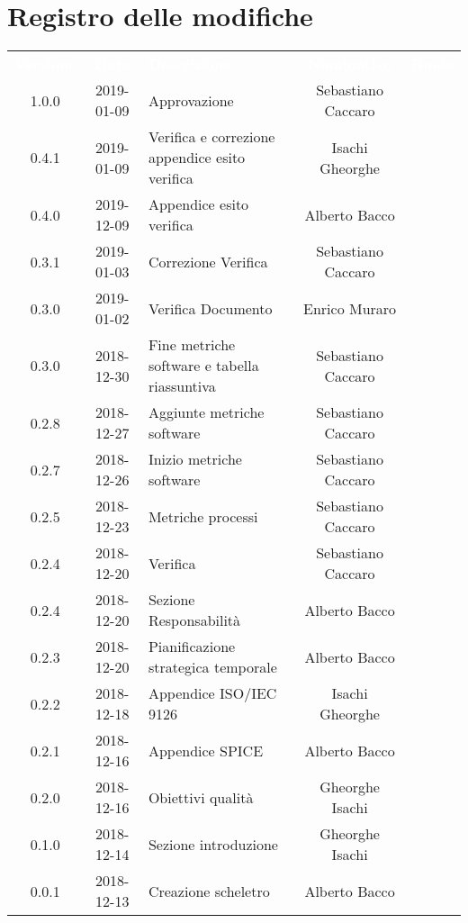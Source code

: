 \section*{Registro delle modifiche}
{
	\renewcommand{\arraystretch}{1.5}
	\centering
	\begin{longtable}{c c C{4cm} c  c }
		\textcolor{white}{\textbf{Versione}} &
		\textcolor{white}{\textbf{Data}} &
		\textcolor{white}{\textbf{Descrizione}} &
		\textcolor{white}{\textbf{Nominativo}} &
		\textcolor{white}{\textbf{Ruolo}}
		\\
		1.0.0 &
		2019-01-09 &
		Approvazione &
		Sebastiano Caccaro &
		\Res{}
		\\
		0.4.1 &
		2019-01-09 &
		Verifica e correzione appendice esito verifica &
		Isachi Gheorghe &
		\ver{}
		\\
		0.4.0 &
		2019-12-09 &
		Appendice esito verifica &
		Alberto Bacco &
		\ver{}
		\\
		0.3.1 &
		2019-01-03 &
		Correzione Verifica &
		Sebastiano Caccaro &
		\reda{}
		\\
		0.3.0 &
		2019-01-02 &
		Verifica Documento &
		Enrico Muraro &
		\ver{}
		\\
		0.3.0 &
		2018-12-30 &
		Fine metriche software e tabella riassuntiva &
		Sebastiano Caccaro &
		\reda{}
		\\
		0.2.8 &
		2018-12-27 &
		Aggiunte metriche software  &
		Sebastiano Caccaro &
		\reda{}
		\\
		0.2.7 &
		2018-12-26 &
		Inizio metriche software &
		Sebastiano Caccaro &
		\reda{}
		\\
		0.2.5 &
		2018-12-23 &
		Metriche processi &
		Sebastiano Caccaro &
		\reda{}
		\\
		0.2.4 &
		2018-12-20 &
		Verifica &
		Sebastiano Caccaro &
		\reda{}		
		\\
		0.2.4 &
		2018-12-20 &
		Sezione Responsabilità &
		Alberto Bacco &
		\reda{}
		\\
		0.2.3 &
		2018-12-20 &
		Pianificazione strategica temporale &
		Alberto Bacco &
		\reda{}
		\\
		0.2.2 &
		2018-12-18 &
		Appendice ISO/IEC 9126 &
		Isachi Gheorghe &
		\reda{}
		\\
		0.2.1 &
		2018-12-16 &
		Appendice SPICE &
		Alberto Bacco &
		\reda{}
		\\
		0.2.0 &
		2018-12-16 &
		Obiettivi qualità &
		Gheorghe Isachi &
		\reda{}
		\\
		0.1.0 &
		2018-12-14 &
		Sezione introduzione &
		Gheorghe Isachi&
		\reda{}
		\\
		0.0.1 &
		2018-12-13 &
		Creazione scheletro &
		Alberto Bacco&
		\reda{}
		\\
	\end{longtable}

}